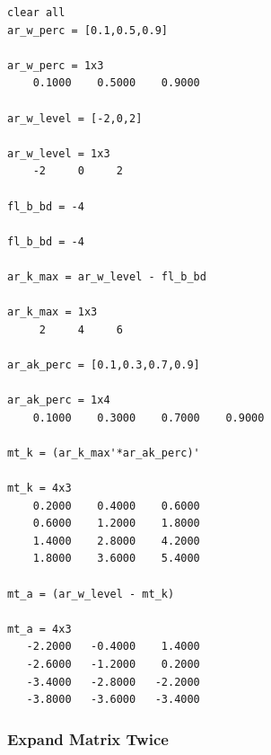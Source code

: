 \documentclass[
]{book}
\begin{document}
\begin{verbatim}
clear all
ar_w_perc = [0.1,0.5,0.9]

ar_w_perc = 1x3    
    0.1000    0.5000    0.9000

ar_w_level = [-2,0,2]

ar_w_level = 1x3    
    -2     0     2

fl_b_bd = -4

fl_b_bd = -4

ar_k_max = ar_w_level - fl_b_bd

ar_k_max = 1x3    
     2     4     6

ar_ak_perc = [0.1,0.3,0.7,0.9]

ar_ak_perc = 1x4    
    0.1000    0.3000    0.7000    0.9000

mt_k = (ar_k_max'*ar_ak_perc)'

mt_k = 4x3    
    0.2000    0.4000    0.6000
    0.6000    1.2000    1.8000
    1.4000    2.8000    4.2000
    1.8000    3.6000    5.4000

mt_a = (ar_w_level - mt_k)

mt_a = 4x3    
   -2.2000   -0.4000    1.4000
   -2.6000   -1.2000    0.2000
   -3.4000   -2.8000   -2.2000
   -3.8000   -3.6000   -3.4000
\end{verbatim}

\hypertarget{expand-matrix-twice}{%
\subsubsection{Expand Matrix Twice}\label{expand-matrix-twice}}
\end{document}
